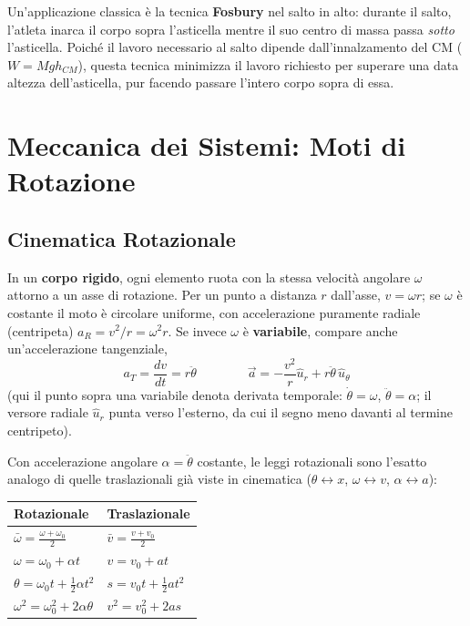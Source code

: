 \documentclass[a4paper,11pt]{article}
\begin{document}
Un'applicazione classica è la tecnica \textbf{Fosbury} nel salto in alto: durante il salto, l'atleta inarca il corpo sopra l'asticella mentre il suo centro di massa passa \emph{sotto} l'asticella. Poiché il lavoro necessario al salto dipende dall'innalzamento del CM ($W=Mgh_{CM}$), questa tecnica minimizza il lavoro richiesto per superare una data altezza dell'asticella, pur facendo passare l'intero corpo sopra di essa.

\newpage
\section{Meccanica dei Sistemi: Moti di Rotazione}

\subsection{Cinematica Rotazionale}

In un \textbf{corpo rigido}, ogni elemento ruota con la stessa velocità angolare $\omega$ attorno a un asse di rotazione. Per un punto a distanza $r$ dall'asse, $v=\omega r$; se $\omega$ è costante il moto è circolare uniforme, con accelerazione puramente radiale (centripeta) $a_R=v^2/r=\omega^2r$. Se invece $\omega$ è \textbf{variabile}, compare anche un'accelerazione tangenziale,
\[
a_T = \frac{dv}{dt} = r\ddot\theta \qquad\qquad \vec a = -\frac{v^2}{r}\hat u_r + r\ddot\theta\,\hat u_\theta
\]
(qui il punto sopra una variabile denota derivata temporale: $\dot\theta=\omega$, $\ddot\theta=\alpha$; il versore radiale $\hat u_r$ punta verso l'esterno, da cui il segno meno davanti al termine centripeto).

Con accelerazione angolare $\alpha=\ddot\theta$ costante, le leggi rotazionali sono l'esatto analogo di quelle traslazionali già viste in cinematica ($\theta\leftrightarrow x$, $\omega\leftrightarrow v$, $\alpha\leftrightarrow a$):

\begin{center}
\small
\begin{tabular}{ll}
\toprule
\textbf{Rotazionale} & \textbf{Traslazionale} \\
\midrule
$\bar\omega=\frac{\omega+\omega_0}{2}$ & $\bar v=\frac{v+v_0}{2}$ \\
$\omega=\omega_0+\alpha t$ & $v=v_0+at$ \\
$\theta=\omega_0t+\frac12\alpha t^2$ & $s=v_0t+\frac12at^2$ \\
$\omega^2=\omega_0^2+2\alpha\theta$ & $v^2=v_0^2+2as$ \\
\bottomrule
\end{tabular}
\end{center}
\end{document}
